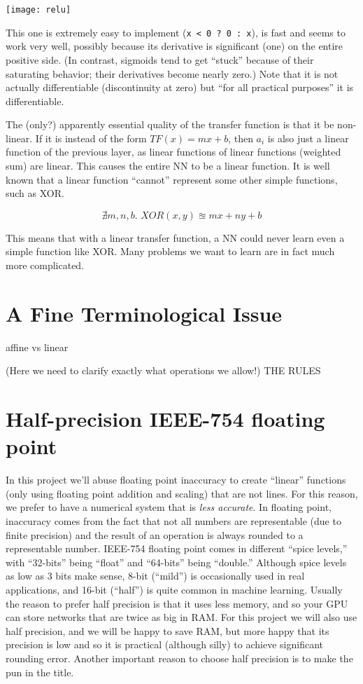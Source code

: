 \documentclass[twocolumn]{article}
\begin{document}
\begin{center}
\texttt{[image: relu]}
\end{center}

This one is extremely easy to implement (\verb+x < 0 ? 0 : x+), is fast
and seems to work very well, possibly because its derivative is
significant (one) on the entire positive side. (In contrast, sigmoids
tend to get ``stuck'' because of their saturating behavior; their
derivatives become nearly zero.) Note that it is not actually
differentiable (discontinuity at zero) but ``for all practical
purposes'' it is differentiable.

The (only?) apparently essential quality of the transfer function is
that it be non-linear. If it is instead of the form $TF(x) = mx + b$,
then $a_i$ is also just a linear function of the previous layer, as
linear functions of linear functions (weighted sum) are linear. This
causes the entire NN to be a linear function. It is well known that a
linear function ``cannot'' represent some other simple functions, such
as XOR.

$$\nexists m,n,b.\,\, XOR(x, y) \approxeq m x + n y + b$$

This means that with a linear transfer function, a NN could never
learn even a simple function like XOR. Many problems we want to learn
are in fact much more complicated.

\section{A Fine Terminological Issue}
affine vs linear

(Here we need to clarify exactly what operations we allow!) THE RULES


\section{Half-precision IEEE-754 floating point}
In this project we'll abuse floating point inaccuracy to create
``linear'' functions (only using floating point addition and scaling)
that are not lines. For this reason, we prefer to have a numerical
system that is {\em less accurate}. In floating point, inaccuracy comes
from the fact that not all numbers are representable (due to finite
precision) and the result of an operation is always rounded to a
representable number. IEEE-754 floating point comes in different
``spice levels,'' with ``32-bits'' being ``float'' and ``64-bits''
being ``double.'' Although spice levels as low as 3 bits make
sense\cite{murphy2019nan}, 8-bit (``mild'') is occasionally used in
real applications, and 16-bit (``half'') is quite common in machine
learning. Usually the reason to prefer half precision is that it uses
less memory, and so your GPU can store networks that are twice as big
in RAM. For this project we will also use half precision, and we will
be happy to save RAM, but more happy that its precision is low and so
it is practical (although silly) to achieve significant rounding
error. Another important reason to choose half precision is to make
the pun in the title.
\end{document}

